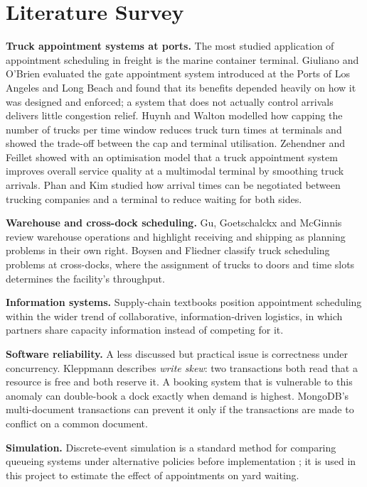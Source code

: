 \section{Literature Survey}
\textbf{Truck appointment systems at ports.} The most studied application of appointment scheduling in freight is the marine container terminal. Giuliano and O'Brien \cite{giuliano2007} evaluated the gate appointment system introduced at the Ports of Los Angeles and Long Beach and found that its benefits depended heavily on how it was designed and enforced; a system that does not actually control arrivals delivers little congestion relief. Huynh and Walton \cite{huynh2008} modelled how capping the number of trucks per time window reduces truck turn times at terminals and showed the trade-off between the cap and terminal utilisation. Zehendner and Feillet \cite{zehendner2014} showed with an optimisation model that a truck appointment system improves overall service quality at a multimodal terminal by smoothing truck arrivals. Phan and Kim \cite{phan2015} studied how arrival times can be negotiated between trucking companies and a terminal to reduce waiting for both sides.

\textbf{Warehouse and cross-dock scheduling.} Gu, Goetschalckx and McGinnis \cite{gu2007} review warehouse operations and highlight receiving and shipping as planning problems in their own right. Boysen and Fliedner \cite{boysen2010} classify truck scheduling problems at cross-docks, where the assignment of trucks to doors and time slots determines the facility's throughput.

\textbf{Information systems.} Supply-chain textbooks \cite{chopra2016,christopher2016,ivanov2019} position appointment scheduling within the wider trend of collaborative, information-driven logistics, in which partners share capacity information instead of competing for it.

\textbf{Software reliability.} A less discussed but practical issue is correctness under concurrency. Kleppmann \cite{kleppmann2017} describes \emph{write skew}: two transactions both read that a resource is free and both reserve it. A booking system that is vulnerable to this anomaly can double-book a dock exactly when demand is highest. MongoDB's multi-document transactions \cite{mongodbtx} can prevent it only if the transactions are made to conflict on a common document.

\textbf{Simulation.} Discrete-event simulation is a standard method for comparing queueing systems under alternative policies before implementation \cite{law2015}; it is used in this project to estimate the effect of appointments on yard waiting.

